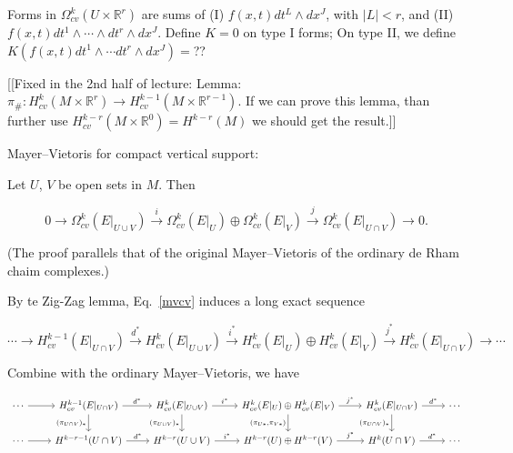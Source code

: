 \documentclass{article}
\theoremstyle{mystyle}
\theoremstyle{remark}
\numberwithin{equation}{section}
\begin{document}
Forms in $\Omega^k_{cv}(U\times \mathbb{R}^r)$ are sums of (I) $f(x,t)dt^L \wedge dx^J$, with $|L|<r$, and (II) $f(x,t)dt^1\wedge \cdots \wedge dt^r\wedge dx^J$. Define $K=0$ on type I forms; On type II, we define $
K\left(f(x,t)dt^1\wedge\cdots dt^r\wedge dx^J\right) =$?? 

[[Fixed in the 2nd half of lecture: Lemma: $\pi_\#\colon H^k_{cv}(M\times \mathbb{R}^r)\rightarrow H^{k-1}_{cv}(M\times \mathbb{R}^{r-1})$. If we can prove this lemma, than further use $H^{k-r}_{cv}(M\times \mathbb{R}^0) = H^{k-r}(M)$ we should get the result.]]


Mayer--Vietoris for compact vertical support:

Let $U$, $V$ be open sets in $M$. Then

\begin{equation}\label{mvcv}
0\rightarrow \Omega^k_{cv}(E|_{U\cup V})
\xrightarrow{i}
\Omega^k_{cv}(E|_U)\oplus \Omega^k_{cv}(E|_V)
\xrightarrow{j}
\Omega^k_{cv}(E|_{U\cap V})\rightarrow 0.
\end{equation}

(The proof parallels that of the original Mayer--Vietoris of the ordinary de Rham chaim complexes.)

By te Zig-Zag lemma, Eq.~\eqref{mvcv} induces a long exact sequence

$$
\cdots \rightarrow H^{k-1}_{cv}(E|_{U\cap V})
\xrightarrow{d^*}
H^k_{cv}(E|_{U\cup V})
\xrightarrow{i^*} H^k_{cv}(E|_U)\oplus H^k_{cv}(E|_V)
\xrightarrow{j^*} H^k_{cv}(E|_{U\cap V})\rightarrow \cdots
$$


Combine with the ordinary Mayer--Vietoris, we have

$$
\begin{tikzcd}
\cdots \ar[r]& H^{k-1}_{cv}(E|_{U\cap V})
\ar[r,"d^*"] \ar[d,"(\pi_{U\cap V})_*"']
&H^k_{cv}(E|_{U\cup V})
\ar[r,"i^*"] \ar[d,"(\pi_{U\cup V})_*"'] & H^k_{cv}(E|_U)\oplus H^k_{cv}(E|_V)
\ar[r,"j^*"] \ar[d,"{(\pi_{U*},\pi_{V*})}"']& H^k_{cv}(E|_{U\cap V})\ar[r,"d^*"]\ar[d,"(\pi_{U\cap V})_*"']& \cdots\\
\cdots \ar[r] & H^{k-r-1}(U\cap V)\ar[r,"d^*"] & H^{k-r}(U\cup V)\ar[r,"i^*"] &
H^{k-r}(U) \oplus H^{k-r}(V)\ar[r,"j^*"] & H^k(U\cap V) \ar[r,"d^*"] &\cdots
\end{tikzcd}
$$
\end{document}
